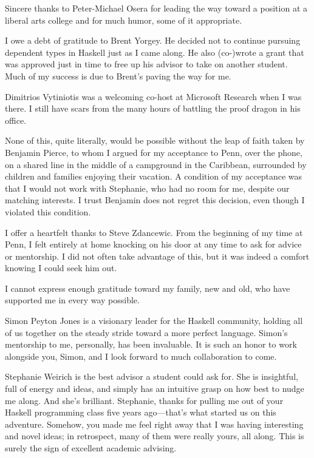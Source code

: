 Sincere thanks to Peter-Michael Osera for leading the way toward
a position at a liberal arts college and for much humor, some of
it appropriate.

I owe a debt of gratitude to Brent Yorgey. He decided not to continue
pursuing dependent types in Haskell just as I came along. He also
(co-)wrote a grant that was approved just in time to free up his
advisor to take on another student. Much of my success is due to
Brent's paving the way for me.

Dimitrios Vytiniotis was a welcoming co-host at Microsoft Research
when I was there. I still have scars from the many hours of battling the
proof dragon in his office.

None of this, quite literally, would be possible without the leap
of faith taken by Benjamin Pierce, to whom I argued for my acceptance
to Penn, over the phone, on a shared line in the middle of a campground
in the Caribbean, surrounded by children and families enjoying
their vacation. A condition of my acceptance was that I would not work
with Stephanie, who had no room for me, despite our matching interests.
I trust Benjamin does not regret this decision, even though I violated
this condition.

I offer a heartfelt thanks to Steve Zdancewic. From the beginning of my
time at Penn, I felt entirely at home knocking on his door at any
time to ask for advice or mentorship. I did not often take advantage of this,
but it was indeed a comfort knowing I could seek him out.

I cannot express enough gratitude toward my family, new and old,
who have supported me in
every way possible.

Simon Peyton Jones is a visionary leader for the Haskell community,
holding all of us together on the steady stride toward a more perfect
language. Simon's mentorship to me, personally, has been invaluable.
It is such an honor to work alongside you, Simon, and I look
forward to much collaboration to come.

Stephanie Weirich is the best advisor a student could ask for. She is
insightful, full of energy and ideas, and simply has an intuitive
grasp on how best to nudge me along. And she's brilliant. Stephanie,
thanks for pulling me out of your Haskell programming class five years
ago---that's what started us on this adventure. Somehow, you made me
feel right away that I was having interesting and novel ideas; in
retrospect, many of them were really yours, all along. This is
surely the sign of excellent academic advising.

